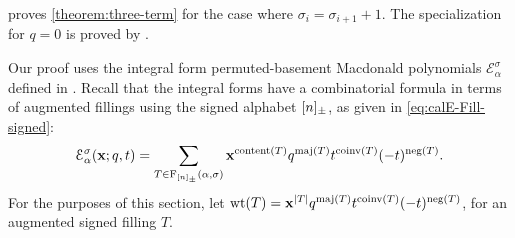 % 


\textcite[Proposition~17]{Ale19} proves \cref{theorem:three-term} for the case where \(\sigma_i = \sigma_{i+1} + 1\).
The specialization for \(q=0\) is proved by \citeauthor{AS19} \cite[Proposition~5.5]{AS19}.

Our proof uses the integral form permuted-basement Macdonald polynomials \(\mathcal{E}_\alpha^\sigma\) defined in .
Recall that the integral forms have a combinatorial formula in terms of augmented fillings using the signed alphabet \([n]_\pm\), as given in \eqref{eq:calE-Fill-signed}:
\begin{equation*}
    \mathcal{E}^{\sigma}_{\alpha}(\mathbf{x}; q, t) =
    \sum_{T \in \Fill[\interval{n}_\pm](\alpha, \sigma)}
    \mathbf{x}^{\content(T)}
    q^{\maj(T)} t^{\coinv(T)}
    (-t)^{\operatorname{neg}(T)}.
\end{equation*}
For the purposes of this section, let \(\wt(T) = \mathbf{x}^{|T|} q^{\maj(T)} t^{\coinv(T)} (-t)^{\operatorname{neg}(T)}\), for an augmented signed filling \(T\).


